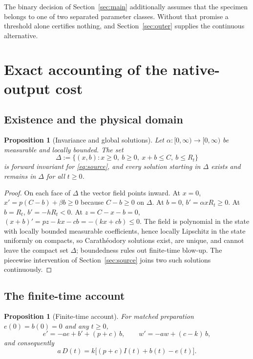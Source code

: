 \documentclass[11pt]{article}
\newtheorem{proposition}[theorem]{Proposition}
\theoremstyle{definition}
\theoremstyle{remark}
\newcommand{\dom}{\Delta}
\begin{document}
The binary decision of Section~\ref{sec:main} additionally assumes that the
specimen belongs to one of two separated parameter classes. Without that
promise a threshold alone certifies nothing, and Section~\ref{sec:outer}
supplies the continuous alternative.

\section{Exact accounting of the native-output cost}
\label{sec:account}

\subsection{Existence and the physical domain}

\begin{proposition}[Invariance and global solutions]\label{prop:domain}
Let $\alpha:[0,\infty)\to[0,\infty)$ be measurable and locally bounded. The set
\[
\dom:=\{(x,b): x\ge0,\ b\ge0,\ x+b\le C,\ b\le R_t\}
\]
is forward invariant for \eqref{eq:source}, and every solution starting in
$\dom$ exists and remains in $\dom$ for all $t\ge0$.
\end{proposition}

\begin{proof}
On each face of $\dom$ the vector field points inward. At $x=0$,
$x'=p(C-b)+\beta b\ge0$ because $C-b\ge0$ on $\dom$. At $b=0$,
$b'=\alpha xR_t\ge0$. At $b=R_t$, $b'=-hR_t<0$. At $z=C-x-b=0$,
$(x+b)'=pz-kx-cb=-(kx+cb)\le0$. The field is polynomial in the state with
locally bounded measurable coefficients, hence locally Lipschitz in the state
uniformly on compacts, so Carath\'eodory solutions exist, are unique, and cannot
leave the compact set $\dom$; boundedness rules out finite-time blow-up. The
piecewise intervention of Section~\ref{sec:source} joins two such solutions
continuously.
\end{proof}

\subsection{The finite-time account}

\begin{proposition}[Finite-time account]\label{prop:finite}
For matched preparation $e(0)=b(0)=0$ and any $t\ge0$,
\begin{equation}
e'=-ae+b'+(p+c)\,b,
\qquad
w'=-aw+(c-k)\,b,
\label{eq:deficit-ode}
\end{equation}
and consequently
\begin{equation}
a\,D(t)=k\bigl[(p+c)I(t)+b(t)-e(t)\bigr].
\label{eq:finite}
\end{equation}
\end{proposition}
\end{document}
